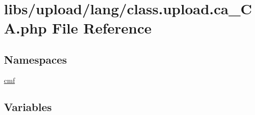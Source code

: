 \hypertarget{class_8upload_8ca___c_a_8php}{}\section{libs/upload/lang/class.upload.\+ca\+\_\+\+C\+A.\+php File Reference}
\label{class_8upload_8ca___c_a_8php}
\subsection*{Namespaces}
\begin{DoxyCompactItemize}
\item 
 \hyperlink{namespacecmf}{cmf}
\end{DoxyCompactItemize}
\subsection*{Variables}

